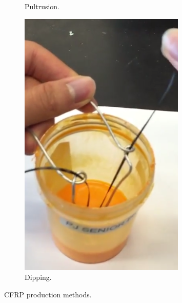 \begin{figure}[t]
\begin{subfigure}[b]{0.4\linewidth}
                \caption{Pultrusion.}
                \label{fig:pultrusion-vid}
        \end{subfigure}
        \begin{subfigure}[b]{0.4\linewidth}
                \includegraphics[width=\linewidth]{./figures/dipping-vid}
                \caption{Dipping.}
                \label{fig:dipping-vid}
        \end{subfigure}
        \caption{CFRP production methods.}\label{fig:slurry-making}
\end{figure}

